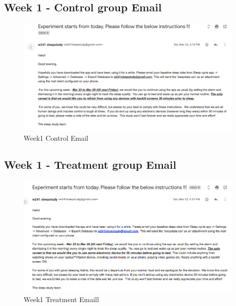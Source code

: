 \documentclass[12pt,]{article}
\begin{document}
\hypertarget{week-1---control-group-email}{%
\subsection{Week 1 - Control group
Email}\label{week-1---control-group-email}}

\begin{figure}[H]

{\centering \includegraphics[width=1\linewidth]{img/week1_control} 

}

\caption{Week1 Control Email}\label{fig:unnamed-chunk-9}
\end{figure}

\hypertarget{week-1---treatment-group-email}{%
\subsection{Week 1 - Treatment group
Email}\label{week-1---treatment-group-email}}

\begin{figure}[H]

{\centering \includegraphics[width=1\linewidth]{img/week1_treatment} 

}

\caption{Week1 Treatment Emaill}\label{fig:unnamed-chunk-10}
\end{figure}
\end{document}

